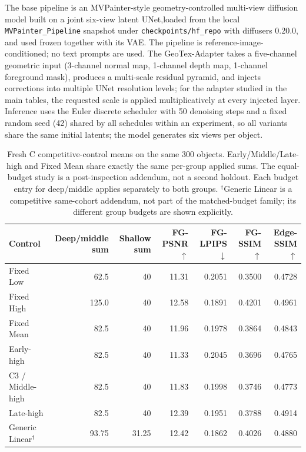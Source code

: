 \documentclass[times,twocolumn,final]{elsarticle}
\providecommand{\DIFdel}[1]{{\protect\color{red} \scriptsize #1}} %
\providecommand{\DIFaddbegin}{} %
\providecommand{\DIFaddend}{} %
\providecommand{\DIFdelbegin}{} %
\providecommand{\DIFdelend}{} %
\begin{document}
\DIFdelbegin \DIFdel{The base pipeline is an MVPainter-style geometry-controlled multi-view diffusion model built on a joint six-view latent UNet,loaded from the local \texttt{MVPainter\_Pipeline} snapshot under \texttt{checkpoints/hf\_repo} with diffusers 0.20.0, and used frozen together with its VAE. The pipeline is reference-image-conditioned; no text prompts are used. The GeoTex-Adapter takes a five-channel geometric input (3-channel normal map, 1-channel depth map, 1-channel foreground mask), produces a multi-scale residual pyramid, and injects corrections into multiple UNet resolution levels; for the adapter studied in the main tables, the requested scale is applied multiplicatively at every injected layer. Inference uses the Euler discrete scheduler with 50 denoising steps and a fixed random seed (42) shared by all schedules within an experiment, so all variants share the same initial latents; the model generates six views per object. }\DIFdelend \DIFaddbegin \begin{table}[t]
\centering\scriptsize\setlength{\tabcolsep}{4pt}
\caption{Fresh C competitive-control means on the same 300 objects. Early/Middle/Late-high and Fixed Mean share exactly the same per-group applied sums. The equal-budget study is a post-inspection addendum, not a second holdout. Each budget entry for deep/middle applies separately to both groups. $^\dagger$Generic Linear is a competitive same-cohort addendum, not part of the matched-budget family; its different group budgets are shown explicitly.}
\label{tab:freshc-absolute}\label{tab:matched-budget300}
\begin{tabular}{lrrrrrr}
\toprule Control & Deep/middle sum & Shallow sum & FG-PSNR$\uparrow$ & FG-LPIPS$\downarrow$ & FG-SSIM$\uparrow$ & Edge-SSIM$\uparrow$ \\
\midrule
Fixed Low & 62.5 & 40 & 11.31 & 0.2051 & 0.3500 & 0.4728 \\
Fixed High & 125.0 & 40 & 12.58 & 0.1891 & 0.4201 & 0.4961 \\
Fixed Mean & 82.5 & 40 & 11.96 & 0.1978 & 0.3864 & 0.4843 \\
Early-high & 82.5 & 40 & 11.33 & 0.2045 & 0.3696 & 0.4765 \\
C3 / Middle-high & 82.5 & 40 & 11.83 & 0.1998 & 0.3746 & 0.4773 \\
Late-high & 82.5 & 40 & 12.39 & 0.1951 & 0.3788 & 0.4914 \\
Generic Linear$^\dagger$ & 93.75 & 31.25 & 12.42 & 0.1862 & 0.4026 & 0.4880 \\

\bottomrule
\end{tabular}
\end{table}
\DIFaddend 
\end{document}
